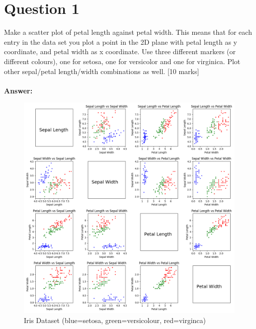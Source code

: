 \documentclass{article}
\begin{document}
\section{Question 1}
Make a scatter plot of petal length against petal width. This means that for each entry in the data set you plot a point in the 2D plane with petal length as y coordinate, and petal width as x coordinate. Use three different markers (or different colours), one for setosa, one for versicolor and one for virginica. Plot other sepal/petal length/width combinations as well.
[10 marks]\\\\
\textbf{Answer:}\\
\begin{figure}[H]
\centering
\includegraphics[scale=0.4]{./img/iris.png}
\caption{Iris Dataset (blue=setosa, green=versicolour, red=virginca)}
\end{figure}
\end{document}
